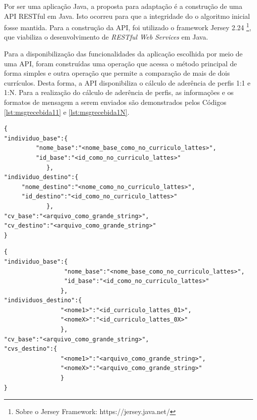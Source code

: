 Por ser uma aplicação Java, a proposta para adaptação é a construção de uma API RESTful em Java. Isto ocorreu para que a integridade do o algoritmo inicial fosse mantida. Para a construção da API, foi utilizado o framework Jersey 2.24 \footnote{Sobre o Jersey Framework: https://jersey.java.net/}, que viabiliza o desenvolvimento de \textit{RESTful Web Services} em Java.

Para a disponibilização das funcionalidades da aplicação escolhida por meio de uma API, foram construídas uma operação que acessa o método principal de forma simples e outra operação que permite a comparação de mais de dois currículos. Desta forma, a API disponibiliza o cálculo de aderência de perfis 1:1 e 1:N. Para a realização do cálculo de aderência de perfis, as informações e os formatos de mensagem a serem enviados são demonstrados pelos Códigos \ref{lst:msgrecebida11} e \ref{lst:msgrecebida1N}.



\begin{lstlisting}[caption={Formato de mensagem recebido pela API (1:1).},label={lst:msgrecebida11}]
{
"individuo_base":{
         "nome_base":"<nome_base_como_no_curriculo_lattes>",
         "id_base":"<id_como_no_curriculo_lattes>"
            },
"individuo_destino":{
     "nome_destino":"<nome_como_no_curriculo_lattes>",
     "id_destino":"<id_como_no_curriculo_lattes>"
            },
"cv_base":"<arquivo_como_grande_string>",
"cv_destino":"<arquivo_como_grande_string>"
}
\end{lstlisting}



\begin{lstlisting}[caption={Formato de mensagem recebido pela API (1:N).},label={lst:msgrecebida1N}]
{
"individuo_base":{
	        	 "nome_base":"<nome_base_como_no_curriculo_lattes>",
    		     "id_base":"<id_como_no_curriculo_lattes>"
	            },
"individuos_destino":{
				"<nome1>":"<id_curriculo_lattes_01>",
				"<nomeX>":"<id_curriculo_lattes_0X>"
				},
"cv_base":"<arquivo_como_grande_string>",
"cvs_destino":{
				"<nome1>":"<arquivo_como_grande_string>",
				"<nomeX>":"<arquivo_como_grande_string>"
				}
}
\end{lstlisting}

